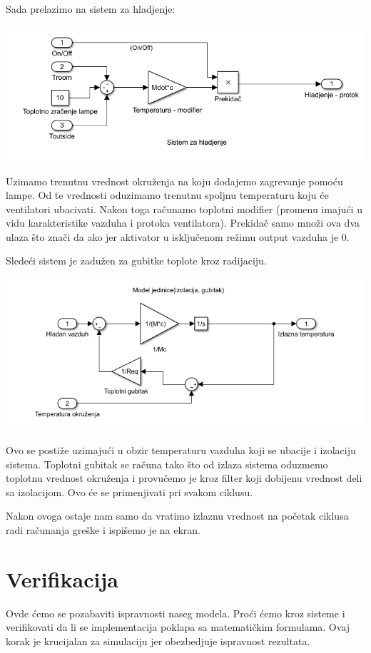 \documentclass[a4paper,11pt]{book}
\begin{document}
Sada prelazimo na sistem za hladjenje:

\includegraphics[width=\textwidth]{vent.png}

Uzimamo trenutnu vrednost okruženja na koju dodajemo zagrevanje pomoću lampe. Od te vrednosti oduzimamo trenutnu spoljnu temperaturu koju će ventilatori ubacivati. Nakon toga računamo toplotni modifier (promenu imajući u vidu karakteristike vazduha i protoka ventilatora). Prekidač samo množi ova dva ulaza što znači da ako jer aktivator u isključenom režimu output vazduha je 0.

Sledeći sistem je zadužen za gubitke toplote kroz radijaciju.

\includegraphics[width=\textwidth]{haus.png}

Ovo se postiže uzimajući u obzir temperaturu vazduha koji se ubacije i izolaciju sistema. Toplotni gubitak se računa tako što od izlaza sistema oduzmemo toplotnu vrednost okruženja i provučemo je kroz filter koji dobijenu vrednost deli sa izolacijom. Ovo će se primenjivati pri svakom ciklusu.

Nakon ovoga ostaje nam samo da vratimo izlaznu vrednost na početak ciklusa radi računanja greške i ispišemo je na ekran.


\section{Verifikacija}

Ovde ćemo se pozabaviti ispravnosti naseg modela. Proći ćemo kroz sisteme i verifikovati da li se implementacija poklapa sa matematičkim formulama. Ovaj korak je krucijalan za simulaciju jer obezbedjuje ispravnost rezultata.
\end{document}
